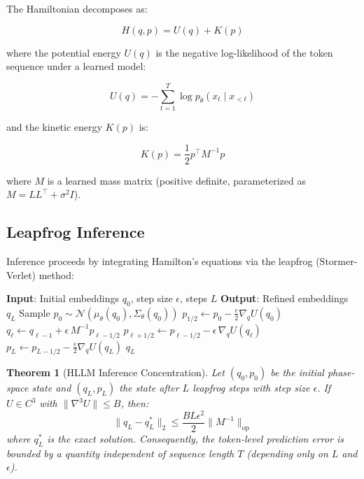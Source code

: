 \documentclass[11pt,letterpaper]{article}
\newtheorem{theorem}{Theorem}[section]
\begin{document}
The Hamiltonian decomposes as:

\begin{equation}
H(q, p) = U(q) + K(p)
\label{eq:hllm_hamiltonian}
\end{equation}

where the potential energy $U(q)$ is the negative log-likelihood of the token sequence under a learned model:

\begin{equation}
U(q) = -\sum_{t=1}^{T} \log p_\theta(x_t \mid x_{<t})
\label{eq:potential}
\end{equation}

and the kinetic energy $K(p)$ is:

\begin{equation}
K(p) = \frac{1}{2} p^\top M^{-1} p
\label{eq:kinetic}
\end{equation}

where $M$ is a learned mass matrix (positive definite, parameterized as $M = L L^\top + \sigma^2 I$).

\subsection{Leapfrog Inference}

Inference proceeds by integrating Hamilton's equations via the leapfrog (Stormer-Verlet) method:

\begin{algorithm}[t]
\caption{HLLM Leapfrog Inference}
\label{alg:leapfrog}
\begin{algorithmic}[1]
\STATE \textbf{Input}: Initial embeddings $q_0$, step size $\epsilon$, steps $L$
\STATE \textbf{Output}: Refined embeddings $q_L$
\STATE Sample $p_0 \sim \mathcal{N}(\mu_\theta(q_0), \Sigma_\theta(q_0))$
\STATE $p_{1/2} \leftarrow p_0 - \frac{\epsilon}{2} \nabla_q U(q_0)$
    \STATE $q_\ell \leftarrow q_{\ell-1} + \epsilon \, M^{-1} p_{\ell-1/2}$
        \STATE $p_{\ell+1/2} \leftarrow p_{\ell-1/2} - \epsilon \, \nabla_q U(q_\ell)$
    \ELSE
        \STATE $p_L \leftarrow p_{L-1/2} - \frac{\epsilon}{2} \nabla_q U(q_L)$
    \ENDIF
\ENDFOR
\RETURN $q_L$
\end{algorithmic}
\end{algorithm}

\begin{theorem}[HLLM Inference Concentration]
\label{thm:concentration}
Let $(q_0, p_0)$ be the initial phase-space state and $(q_L, p_L)$ the state after $L$ leapfrog steps with step size $\epsilon$. If $U \in C^3$ with $\|\nabla^3 U\| \leq B$, then:
\[
\|q_L - q_L^*\|_2 \leq \frac{BL\epsilon^2}{2}\|M^{-1}\|_{\text{op}}
\]
where $q_L^*$ is the exact solution. Consequently, the token-level prediction error is bounded by a quantity independent of sequence length $T$ (depending only on $L$ and $\epsilon$).
\end{theorem}
\end{document}
